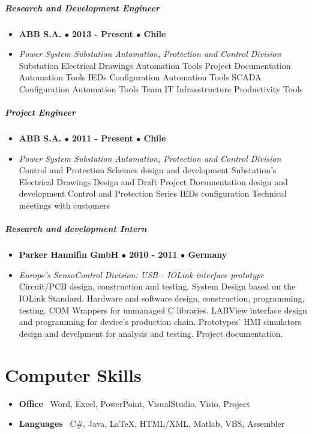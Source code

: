 \documentclass[10pt,letterpaper]{article}
\begin{document}
	\subparagraph{Research and Development Engineer}
	\begin{itemize}
		\item \textbf{ABB S.A. $\bullet$ 2013 - Present $\bullet$  Chile}
		\item \textit{Power System Substation Automation, Protection and Control Division}
			\subitem Substation Electrical Drawings Automation Tools
			\subitem Project Documentation Automation Tools
			\subitem IEDs Configuration Automation Tools
			\subitem SCADA Configuration Automation Tools
			\subitem Team IT Infraestructure Productivity Tools
	\end{itemize}
	
	\subparagraph{Project Engineer}
	\begin{itemize}
		\item \textbf{ABB S.A. $\bullet$ 2011 - Present $\bullet$  Chile}
		\item \textit{Power System Substation Automation, Protection and Control Division}
				\subitem Control and Protection Schemes design and development
				\subitem Substation's Electrical Drawings Design and Draft
				\subitem Project Documentation design and development
				\subitem Control and Protection Series IEDs configuration
				\subitem Technical meetings with customers
		\end{itemize}
		
	\subparagraph{Research and development Intern}
	\begin{itemize}
		\item \textbf{Parker Hannifin GmbH $\bullet$ 2010 - 2011 $\bullet$  Germany}
		\item \textit{Europe's SensoControl Division: USB - IOLink interface prototype}
\subitem Circuit/PCB design, construction and testing.
\subitem System Design based on the IOLink Standard. 
\subitem Hardware and software design, construction, programming, testing.
\subitem COM Wrappers for unmanaged C libraries.
\subitem LABView interface design and programming for device's production chain.
\subitem Prototypes’ HMI simulators design and develpment for analysis and testing.
\subitem Project documentation.
	\end{itemize}
	
	\section*{Computer Skills}
	
	\begin{itemize}
		\item \textbf{Office} \ Word, Excel, PowerPoint, VisualStudio, Visio, Project
		\item \textbf{Languages} \ C\#, Java, \LaTeX, HTML/XML, Matlab, VBS, Assembler
	\end{itemize}		
	
\end{document}
